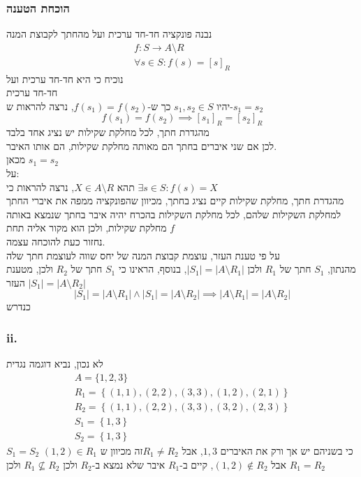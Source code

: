 \documentclass[12pt, titlepage]{article}
\begin{document}
\subsubsection*{הוכחת הטענה}
נבנה פונקציה חד-חד ערכית ועל מהחתך לקבוצת המנה
\begin{gather*}
    f:S\to A\setminus R\\
    \forall s\in S:    f\left(s\right)=\left[s\right]_R
\end{gather*}
נוכיח כי היא חד-חד ערכית ועל\\
חד-חד ערכית\\
יהיו $s_1,s_2\in S$ כך ש-$f\left(s_1\right) = f\left(s_2\right)$, נרצה להראות ש-$s_1=s_2$
\[
    f\left(s_1\right)=f\left(s_2\right)\implies \left[s_1\right]_R = \left[s_2\right]_R
\]
מהגדרת חתך, לכל מחלקת שקילות יש נציג אחד בלבד\\
לכן אם שני איברים בחתך הם מאותה מחלקת שקילות, הם אותו האיבר.\\
מכאן $s_1 = s_2$\\
על:\\
תהא $X \in A\setminus R$, נרצה להראות כי $\exists s\in S: f\left(s\right)=X$\\
מהגדרת חתך,  מחלקת שקילות קיים נציג בחתך, מכיוון שהפונקציה ממפה את איברי החתך למחלקת השקילות שלהם, לכל מחלקת השקילות בהכרח יהיה איבר בחתך שנמצא באותה מחלקת שקילות, ולכן הוא מקור אליה תחת $f$
\bigskip\\
נחזור כעת להוכחה עצמה.\\
על פי טענת העזר, עוצמת קבוצת המנה של יחס שווה לעוצמת חתך שלה\\
מהנתון, $S_1$ חתך של $R_1$ ולכן $\left|S_1\right|=\left|A\setminus R_1\right|$, בנוסף, הראינו כי $S_1$ חתך של $R_2$ ולכן, מטענת העזר $\left|S_1\right|=\left|A\setminus R_2\right|$
\[
    \left|S_1\right|=\left|A\setminus R_1\right|\land\left|S_1\right|=\left|A\setminus R_2\right|\implies\left|A\setminus R_1\right|=\left|A\setminus R_2\right|
\]
כנדרש\\
\blacksquare
\subsubsection*{ii.}
לא נכון, נביא דוגמה נגדית
\begin{gather*}
    A=\{1,2,3\}\\
    R_1 = \left\{\left(1,1\right),\left(2,2\right),\left(3,3\right),\left(1,2\right),\left(2,1\right)\right\}\\
    R_2 = \left\{\left(1,1\right),\left(2,2\right),\left(3,3\right),\left(3,2\right),\left(2,3\right)\right\}\\
    S_1= \left\{1,3\right\}\\
    S_2= \left\{1,3\right\}
\end{gather*}
$S_1=S_2$ כי בשניהם יש אך ורק את האיברים $1,3$, אבל $R_1\neq R_2$זה מכיוון ש $\left(1,2\right)\in R_1$  אבל $\left(1,2\right) \notin R_2$, קיים ב-$R_1$ איבר שלא נמצא ב-$R_2$ ולכן $R_1 \not\subseteq R_2$ ולכן $R_1 = R_2$
\end{document}
